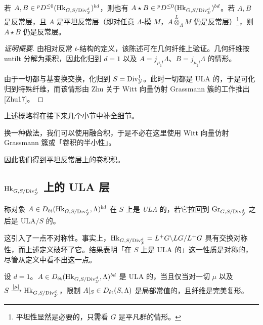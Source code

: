 \begin{proposition}
若 $A,B\in{}^pD^{\le0}(\mathrm{Hk}_{G,S/\Div^d_{\cY}})^{bd}$，则也有 $A\star B\in{}^pD^{\le0}(\mathrm{Hk}_{G,S/\Div^d_{\cY}})^{bd}$。若 $A,B$ 是反常层，且 $A$ 是平坦反常层（即对任意 $\Lambda$-模 $M$，$A\overset{L}{\otimes}_\Lambda M$ 仍是反常层）\footnote{平坦性显然是必要的，只需看 $G$ 是平凡群的情形。}，则 $A\star B$ 仍是反常层。
\end{proposition}

\begin{proof}[证明概要]
由相对反常 $t$-结构的定义，该陈述可在几何纤维上验证。几何纤维按 untilt 分解为乘积，因此化归到 $d=1$ 以及 $A=j_{\mu_1!}\Lambda$、$B=j_{\mu_2!}\Lambda$ 的情形。

由于一切都与基变换交换，化归到 $S=\Div^1_{\cY}$。此时一切都是 ULA 的，于是可化归到特殊纤维，而该情形由 Zhu 关于 Witt 向量仿射 Grassmann 簇的工作推出 [Zhu17]。
\end{proof}

上述概略将在接下来几个小节中补全细节。


\begin{remark}
换一种做法，我们可以使用融合积，于是不必在这里使用 Witt 向量仿射 Grassmann 簇或「卷积的半小性」。

因此我们得到平坦反常层上的卷积积。
\end{remark}

\subsection{$\mathrm{Hk}_{G,S/\Div^d_{\cY}}$ 上的 ULA 层}

\begin{definition}
称对象 $A\in D_{\et}(\mathrm{Hk}_{G,S/\Div^d_{\cY}},\Lambda)^{bd}$ 在 $S$ 上是 \emph{ULA} 的，若它拉回到 $\Gr_{G,S/\Div^d_{\cY}}$ 之后是 ULA$/S$ 的。
\end{definition}

\begin{warning}
这引入了一点不对称性。事实上，$\mathrm{Hk}_{G,S/\Div^d_{\cY}}=L^+G\backslash LG/L^+G$ 具有交换对称性，而上述定义破坏了它。结果表明「在 $S$ 上是 ULA 的」这一性质是对称的，尽管从定义中看不出这一点。
\end{warning}

\begin{proposition}
设 $d=1$。$A\in D_{\et}(\mathrm{Hk}_{G,S/\Div^d_{\cY}},\Lambda)^{bd}$ 是 ULA 的，当且仅当对一切 $\mu$ 以及 $S\xrightarrow{[\mu]}\mathrm{Hk}_{G,S/\Div^d_{\cY}}$，限制 $A|_S\in D_{\et}(S,\Lambda)$ 是局部常值的，且纤维是完美复形。
\end{proposition}

